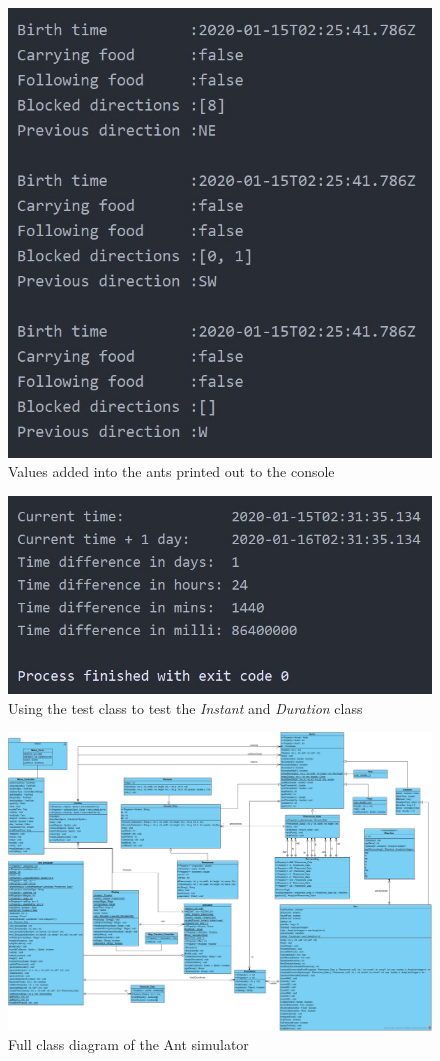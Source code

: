 \documentclass[a4paper, oneside, 11pt]{report}
\begin{document}
\begin{figure}[htb]
	\begin{center}
		\includegraphics[width=0.6 \columnwidth]{Ant_Values.jpg}
		\caption{Values added into the ants printed out to the console}
		\label{fig:Ant_Values}
	\end{center}
\end{figure}

\begin{figure}[htb]
	\begin{center}
		\includegraphics[width=0.6 \columnwidth]{Test_Class.jpg}
		\caption{Using the test class to test the \textit{Instant} and \textit{Duration} class}
		\label{fig:Test_Class}
	\end{center}
\end{figure}


\begin{figure}
	\begin{center}
		\includegraphics[width=1.0 \columnwidth]{Full_Class_Diagram.jpg}
		\caption{Full class diagram of the Ant simulator}
		\label{fig:Full_Class_Diagram}
	\end{center}
\end{figure}
\end{document}
